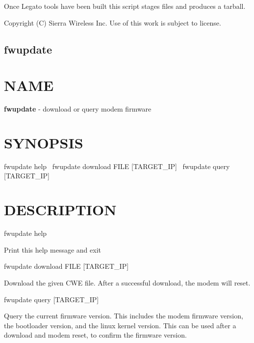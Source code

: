 Once Legato tools have been built this script stages files and produces a tarball.



 Copyright (C) Sierra Wireless Inc. Use of this work is subject to license. \hypertarget{toolsHost_fwupdate}{}\subsection{fwupdate}\label{toolsHost_fwupdate}
\section*{N\+A\+M\+E}

{\bfseries fwupdate} -\/ download or query modem firmware

\section*{S\+Y\+N\+O\+P\+S\+I\+S}

{\ttfamily fwupdate help}~\newline
 {\ttfamily fwupdate download F\+I\+L\+E \mbox{[}T\+A\+R\+G\+E\+T\+\_\+\+I\+P\mbox{]}}~\newline
 {\ttfamily fwupdate query \mbox{[}T\+A\+R\+G\+E\+T\+\_\+\+I\+P\mbox{]}}~\newline


\section*{D\+E\+S\+C\+R\+I\+P\+T\+I\+O\+N}

fwupdate help
\begin{DoxyItemize}
\item Print this help message and exit
\end{DoxyItemize}

fwupdate download F\+I\+L\+E \mbox{[}T\+A\+R\+G\+E\+T\+\_\+\+I\+P\mbox{]}
\begin{DoxyItemize}
\item Download the given C\+W\+E file. After a successful download, the modem will reset.
\end{DoxyItemize}

fwupdate query \mbox{[}T\+A\+R\+G\+E\+T\+\_\+\+I\+P\mbox{]}
\begin{DoxyItemize}
\item Query the current firmware version. This includes the modem firmware version, the bootloader version, and the linux kernel version. This can be used after a download and modem reset, to confirm the firmware version.
\end{DoxyItemize}

